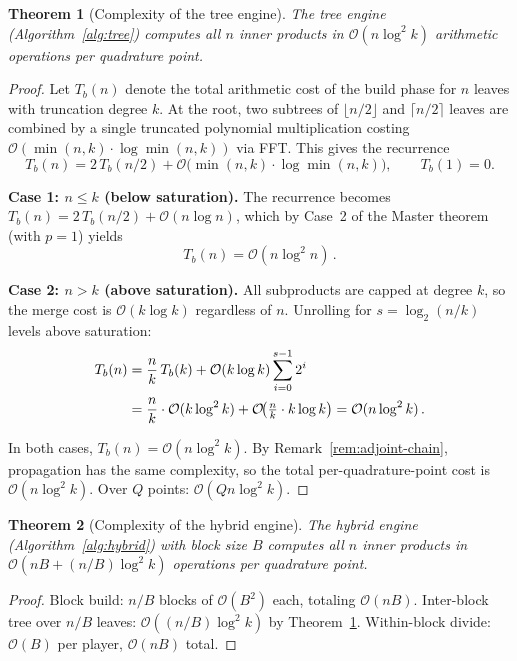\documentclass[11pt]{article}
\newtheorem{theorem}{Theorem}[section]
\newcommand{\bigO}{\mathcal{O}}
\begin{document}
\begin{theorem}[Complexity of the tree engine]\label{thm:tree-complexity}
The tree engine (Algorithm~\ref{alg:tree}) computes all $n$ inner products
in $\bigO(n \log^2 k)$ arithmetic operations per quadrature point.
\end{theorem}
\begin{proof}
Let $T_b(n)$ denote the total arithmetic cost of the build phase for $n$
leaves with truncation degree $k$.  At the root, two subtrees of
$\lfloor n/2 \rfloor$ and $\lceil n/2 \rceil$ leaves are combined by a
single truncated polynomial multiplication costing
$\bigO(\min(n, k) \cdot \log \min(n, k))$ via FFT.  This gives the
recurrence
\begin{equation}\label{eq:build-recurrence}
  T_b(n) = 2\, T_b(n/2)
  + \bigO\!\bigl(\min(n, k) \cdot \log \min(n, k)\bigr),
  \qquad T_b(1) = 0.
\end{equation}

\textbf{Case 1: $n \le k$ (below saturation).}
The recurrence becomes $T_b(n) = 2\,T_b(n/2) + \bigO(n \log n)$, which
by Case~2 of the Master theorem (with $p = 1$) yields
\begin{equation}\label{eq:below-sat}
  T_b(n) = \bigO(n \log^2 n)\,.
\end{equation}

\textbf{Case 2: $n > k$ (above saturation).}
All subproducts are capped at degree $k$, so the merge cost is
$\bigO(k \log k)$ regardless of $n$.  Unrolling for $s = \log_2(n/k)$
levels above saturation:
\begin{align}
  T_b(n) &= \frac{n}{k}\, T_b(k)
    + \bigO(k \log k) \sum_{i=0}^{s-1} 2^i \notag\\
  &= \frac{n}{k} \cdot \bigO(k \log^2 k)
    + \bigO\!\bigl(\tfrac{n}{k} \cdot k \log k\bigr)
  = \bigO(n \log^2 k)\,. \label{eq:above-sat}
\end{align}

In both cases, $T_b(n) = \bigO(n \log^2 k)$.  By
Remark~\ref{rem:adjoint-chain}, propagation has the same complexity,
so the total per-quadrature-point cost is $\bigO(n \log^2 k)$.
Over $Q$ points: $\bigO(Qn \log^2 k)$.
\end{proof}

\begin{theorem}[Complexity of the hybrid engine]\label{thm:hybrid-complexity}
The hybrid engine (Algorithm~\ref{alg:hybrid}) with block size $B$
computes all $n$ inner products in
$\bigO(nB + (n/B) \log^2 k)$ operations per quadrature point.
\end{theorem}
\begin{proof}
Block build: $n/B$ blocks of $\bigO(B^2)$ each, totaling $\bigO(nB)$.
Inter-block tree over $n/B$ leaves: $\bigO((n/B) \log^2 k)$ by
Theorem~\ref{thm:tree-complexity}. Within-block divide: $\bigO(B)$
per player, $\bigO(nB)$ total.
\end{proof}
\end{document}
